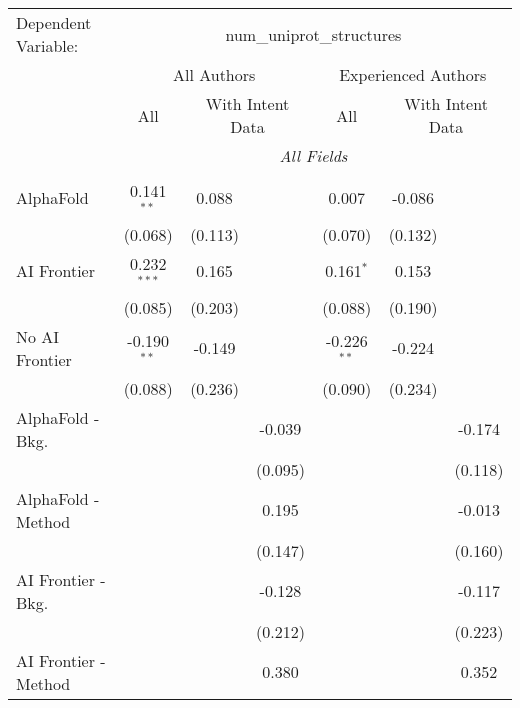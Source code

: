 \begingroup
\centering
\begin{tabular}{lcccccc}
   \tabularnewline \midrule \midrule
   Dependent Variable: & \multicolumn{6}{c}{num\_uniprot\_structures}\\
 & \multicolumn{3}{c}{All Authors} & \multicolumn{3}{c}{Experienced Authors} \\
\cmidrule(lr){2-4} \cmidrule(lr){5-7}
 & \multicolumn{1}{c}{All} & \multicolumn{2}{c}{With Intent Data} & \multicolumn{1}{c}{All} & \multicolumn{2}{c}{With Intent Data} \\
\cmidrule(lr){2-2} \cmidrule(lr){3-4} \cmidrule(lr){5-5} \cmidrule(lr){6-7}
 & \multicolumn{6}{c}{\textit{All Fields}} \\ \\
   AlphaFold               & 0.141$^{**}$  & 0.088   &         & 0.007         & -0.086  &   \\   
                           & (0.068)       & (0.113) &         & (0.070)       & (0.132) &   \\   
   AI Frontier             & 0.232$^{***}$ & 0.165   &         & 0.161$^{*}$   & 0.153   &   \\   
                           & (0.085)       & (0.203) &         & (0.088)       & (0.190) &   \\   
   No AI Frontier          & -0.190$^{**}$ & -0.149  &         & -0.226$^{**}$ & -0.224  &   \\   
                           & (0.088)       & (0.236) &         & (0.090)       & (0.234) &   \\   
   AlphaFold - Bkg.        &               &         & -0.039  &               &         & -0.174\\   
                           &               &         & (0.095) &               &         & (0.118)\\   
   AlphaFold - Method      &               &         & 0.195   &               &         & -0.013\\   
                           &               &         & (0.147) &               &         & (0.160)\\   
   AI Frontier - Bkg.      &               &         & -0.128  &               &         & -0.117\\   
                           &               &         & (0.212) &               &         & (0.223)\\   
   AI Frontier - Method    &               &         & 0.380   &               &         & 0.352\\   

\end{tabular}
